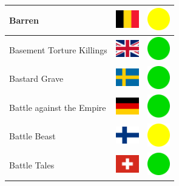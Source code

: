 \documentclass[12pt, a4paper, twoside]{report}
\begin{document}
\begin{center}
\begin{longtable}{|p{5cm}|p{2cm}|p{2cm}|}
 Barren                                                     & \includegraphics[width=1cm]{../4x3/be} &   \includegraphics[width=1cm]{../likes/m} \\ \hline
 Basement Torture Killings                                  & \includegraphics[width=1cm]{../4x3/gb} &   \includegraphics[width=1cm]{../likes/y} \\ \hline
 Bastard Grave                                              & \includegraphics[width=1cm]{../4x3/se} &   \includegraphics[width=1cm]{../likes/y} \\ \hline
 Battle against the Empire                                  & \includegraphics[width=1cm]{../4x3/de} &   \includegraphics[width=1cm]{../likes/y} \\ \hline
 Battle Beast                                               & \includegraphics[width=1cm]{../4x3/fi} &   \includegraphics[width=1cm]{../likes/m} \\ \hline
 Battle Tales                                               & \includegraphics[width=1cm]{../4x3/ch} &   \includegraphics[width=1cm]{../likes/y} \\ \hline

\end{longtable}
\end{center}
\end{document}
